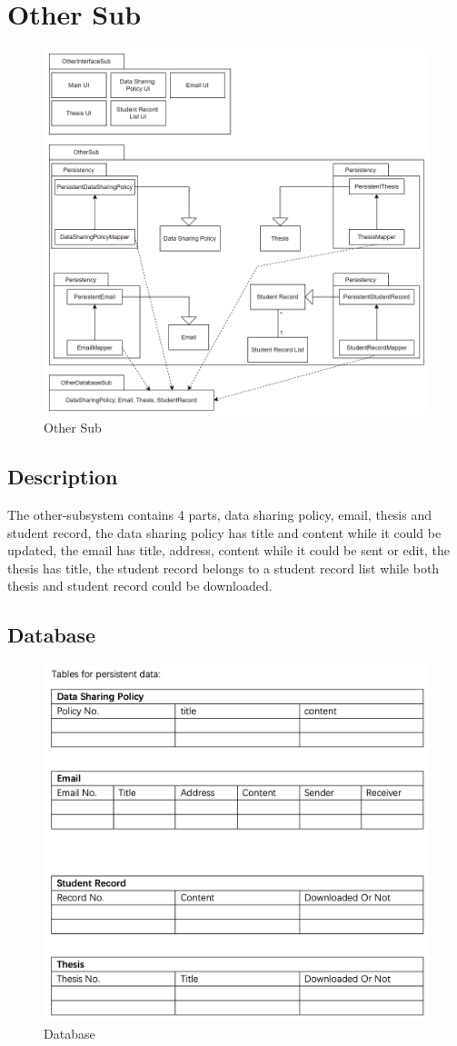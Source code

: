 \section{Other Sub}

\begin{figure}[H]
    \centering
    \includegraphics[width=0.75\linewidth]{picture/3-4/3-4-1.png}
    \caption{Other Sub}
    \label{fig:enter-label}
\end{figure}

\subsection{Description}

The other-subsystem contains 4 parts, data sharing policy, email, thesis and student record, the data sharing policy has title and content while it could be updated, the email has title, address, content while it could be sent or edit, the thesis has title, the student record belongs to a student record list while both thesis and student record could be downloaded. 

\subsection{Database}
\begin{figure}[H]
    \centering
    \includegraphics[width=0.75\linewidth]{picture/3-4/3-4-2.png}
    \caption{Database}
    \label{fig:enter-label}
\end{figure}

